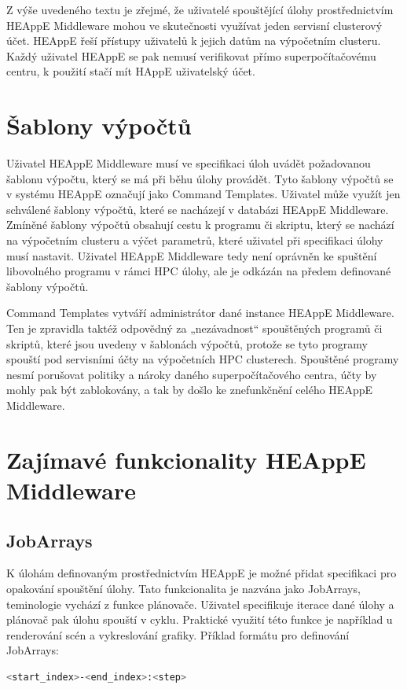 Z výše uvedeného textu je zřejmé, že uživatelé spouštějící úlohy prostřednictvím HEAppE Middleware mohou ve skutečnosti využívat jeden servisní clusterový účet. HEAppE řeší přístupy uživatelů k jejich datům na výpočetním clusteru. Každý uživatel HEAppE se pak nemusí verifikovat přímo superpočítačovému centru, k použití stačí mít HAppE uživatelský účet.

\section{Šablony výpočtů}
Uživatel HEAppE Middleware musí ve specifikaci úloh uvádět požadovanou šablonu výpočtu, který se má při běhu úlohy provádět. Tyto šablony výpočtů se v systému HEAppE označují jako Command Templates. Uživatel může využít jen schválené šablony výpočtů, které se nacházejí v databázi HEAppE Middleware. Zmíněné šablony výpočtů obsahují cestu k programu či skriptu, který se nachází na výpočetním clusteru a výčet parametrů, které uživatel při specifikaci úlohy musí nastavit. Uživatel HEAppE Middleware tedy není oprávněn ke spuštění libovolného programu v rámci HPC úlohy, ale je odkázán na předem definované šablony výpočtů.

Command Templates vytváří administrátor dané instance HEAppE Middleware. Ten je zpravidla taktéž odpovědný za „nezávadnost“ spouštěných programů či skriptů, které jsou uvedeny v šablonách výpočtů, protože se tyto programy spouští pod servisními účty na výpočetních HPC clusterech. Spouštěné programy nesmí porušovat politiky a nároky daného superpočítačového centra, účty by mohly pak být zablokovány, a tak by došlo ke znefunkčnění celého HEAppE Middleware.

\section{Zajímavé funkcionality HEAppE Middleware}
\subsection{JobArrays}
K úlohám definovaným prostřednictvím HEAppE je možné přidat specifikaci pro opakování spouštění úlohy. Tato funkcionalita je nazvána jako JobArrays, teminologie vychází z funkce plánovače. Uživatel specifikuje iterace dané úlohy a plánovač pak úlohu spouští v cyklu. Praktické využití této funkce je například u renderování scén a vykreslování grafiky.
Příklad formátu pro definování JobArrays:


\begin{lstlisting}[language=bash,caption={Struktura definice JobArrays}]
                            <start_index>-<end_index>:<step>
\end{lstlisting}

